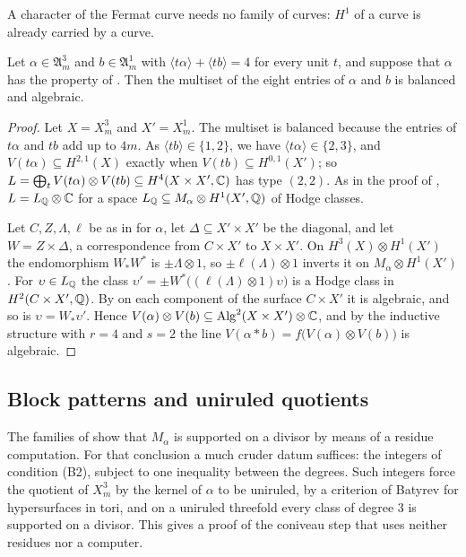 A character of the Fermat curve needs no family of curves: $H^{1}$ of a
curve is already carried by a curve.

\begin{proposition}\label{prop:joincurve}
Let $\alpha\in\mathfrak A^{3}_{m}$ and $b\in\mathfrak A^{1}_{m}$ with
$\langle t\alpha\rangle+\langle tb\rangle=4$ for every unit $t$, and suppose
that $\alpha$ has the property of . Then the multiset of
the eight entries of $\alpha$ and $b$ is balanced and algebraic.
\end{proposition}

\begin{proof}
Let $X=X^{3}_{m}$ and $X'=X^{1}_{m}$. The multiset is balanced because the
entries of $t\alpha$ and $tb$ add up to $4m$. As $\langle tb\rangle\in
\{1,2\}$, we have $\langle t\alpha\rangle\in\{2,3\}$, and $V(t\alpha)
\subseteq H^{2,1}(X)$ exactly when $V(tb)\subseteq H^{0,1}(X')$; so
$L=\bigoplus_{t}V(t\alpha)\otimes V(tb)\subseteq H^{4}(X\times X',\mathbb{C})$ has
type $(2,2)$. As in the proof of , $L=L_{\mathbb{Q}}\otimes\mathbb{C}$ for
a space $L_{\mathbb{Q}}\subseteq M_{\alpha}\otimes H^{1}(X',\mathbb{Q})$ of Hodge classes.

Let $C,Z,\Lambda,\ell$ be as in  for $\alpha$, let
$\Delta\subseteq X'\times X'$ be the diagonal, and let $W=Z\times\Delta$, a
correspondence from $C\times X'$ to $X\times X'$. On $H^{3}(X)\otimes
H^{1}(X')$ the endomorphism $W_{*}W^{*}$ is $\pm\Lambda\otimes1$, so
$\pm\ell(\Lambda)\otimes1$ inverts it on $M_{\alpha}\otimes H^{1}(X')$. For
$\upsilon\in L_{\mathbb{Q}}$ the class $\upsilon'=\pm W^{*}\bigl((\ell(\Lambda)
\otimes1)\upsilon\bigr)$ is a Hodge class in $H^{2}(C\times X',\mathbb{Q})$. By
 on each component of the surface $C\times X'$ it is
algebraic, and so is $\upsilon=W_{*}\upsilon'$. Hence $V(\alpha)\otimes
V(b)\subseteq\operatorname{Alg}^{2}(X\times X')\otimes\mathbb{C}$, and by the inductive structure
with $r=4$ and $s=2$ the line $V(\alpha*b)=f\bigl(V(\alpha)\otimes
V(b)\bigr)$ is algebraic.
\end{proof}

\subsection{Block patterns and uniruled quotients}\label{ssec:uniruled}
The families of  show that $M_{\alpha}$ is supported on
a divisor by means of a residue computation. For that conclusion a much
cruder datum suffices: the integers of condition (B2), subject to one
inequality between the degrees. Such integers force the quotient of
$X^{3}_{m}$ by the kernel of $\alpha$ to be uniruled, by a criterion of
Batyrev for hypersurfaces in tori, and on a uniruled threefold every class
of degree $3$ is supported on a divisor. This gives a proof of the coniveau
step that uses neither residues nor a computer.

